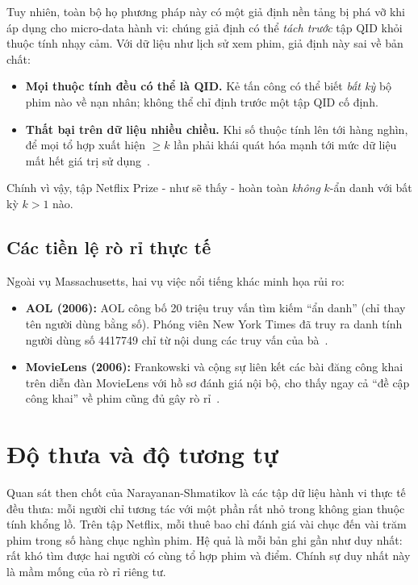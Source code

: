 Tuy nhiên, toàn bộ họ phương pháp này có một giả định nền tảng bị phá vỡ khi áp dụng cho micro-data hành vi: chúng giả định có thể \textit{tách trước} tập QID khỏi thuộc tính nhạy cảm. Với dữ liệu như lịch sử xem phim, giả định này sai về bản chất:
\renewcommand{\labelitemi}{$-$}
\begin{itemize}
	\item \textbf{Mọi thuộc tính đều có thể là QID.} Kẻ tấn công có thể biết \textit{bất kỳ} bộ phim nào về nạn nhân; không thể chỉ định trước một tập QID cố định.
	\item \textbf{Thất bại trên dữ liệu nhiều chiều.} Khi số thuộc tính lên tới hàng nghìn, để mọi tổ hợp xuất hiện $\ge k$ lần phải khái quát hóa mạnh tới mức dữ liệu mất hết giá trị sử dụng~\cite{narayanan}.
\end{itemize}
Chính vì vậy, tập Netflix Prize - như sẽ thấy - hoàn toàn \textit{không} $k$-ẩn danh với bất kỳ $k > 1$ nào.

\subsection{Các tiền lệ rò rỉ thực tế}
Ngoài vụ Massachusetts, hai vụ việc nổi tiếng khác minh họa rủi ro:
\begin{itemize}
	\item \textbf{AOL (2006):} AOL công bố 20 triệu truy vấn tìm kiếm ``ẩn danh'' (chỉ thay tên người dùng bằng số). Phóng viên New York Times đã truy ra danh tính người dùng số 4417749 chỉ từ nội dung các truy vấn của bà~\cite{aol}.
	\item \textbf{MovieLens (2006):} Frankowski và cộng sự liên kết các bài đăng công khai trên diễn đàn MovieLens với hồ sơ đánh giá nội bộ, cho thấy ngay cả ``đề cập công khai'' về phim cũng đủ gây rò rỉ~\cite{frankowski}.
\end{itemize}

\section{Độ thưa và độ tương tự}

Quan sát then chốt của Narayanan-Shmatikov là các tập dữ liệu hành vi thực tế đều thưa: mỗi người chỉ tương tác với một phần rất nhỏ trong không gian thuộc tính khổng lồ. Trên tập Netflix, mỗi thuê bao chỉ đánh giá vài chục đến vài trăm phim trong số hàng chục nghìn phim. Hệ quả là mỗi bản ghi gần như duy nhất: rất khó tìm được hai người có cùng tổ hợp phim và điểm. Chính sự duy nhất này là mầm mống của rò rỉ riêng tư.


